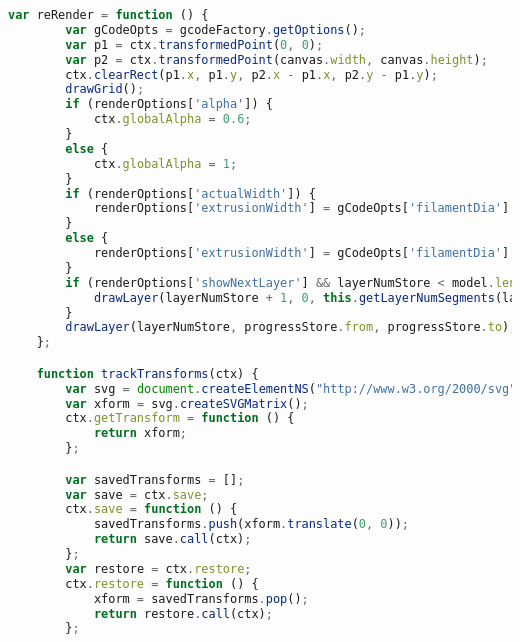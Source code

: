 \begin{lstlisting}[language=JavaScript, label={lst:renderFactory}, caption=When render frames are requested this file compiles the lines of gcode from the worker and sets up the rest of the canvas frames.]
    var reRender = function () {
        var gCodeOpts = gcodeFactory.getOptions();
        var p1 = ctx.transformedPoint(0, 0);
        var p2 = ctx.transformedPoint(canvas.width, canvas.height);
        ctx.clearRect(p1.x, p1.y, p2.x - p1.x, p2.y - p1.y);
        drawGrid();
        if (renderOptions['alpha']) {
            ctx.globalAlpha = 0.6;
        }
        else {
            ctx.globalAlpha = 1;
        }
        if (renderOptions['actualWidth']) {
            renderOptions['extrusionWidth'] = gCodeOpts['filamentDia'] * gCodeOpts['wh'] / zoomFactor;
        }
        else {
            renderOptions['extrusionWidth'] = gCodeOpts['filamentDia'] * gCodeOpts['wh'] / zoomFactor / 2;
        }
        if (renderOptions['showNextLayer'] && layerNumStore < model.length - 1) {
            drawLayer(layerNumStore + 1, 0, this.getLayerNumSegments(layerNumStore + 1), true);
        }
        drawLayer(layerNumStore, progressStore.from, progressStore.to);
    };

    function trackTransforms(ctx) {
        var svg = document.createElementNS("http://www.w3.org/2000/svg", 'svg');
        var xform = svg.createSVGMatrix();
        ctx.getTransform = function () {
            return xform;
        };

        var savedTransforms = [];
        var save = ctx.save;
        ctx.save = function () {
            savedTransforms.push(xform.translate(0, 0));
            return save.call(ctx);
        };
        var restore = ctx.restore;
        ctx.restore = function () {
            xform = savedTransforms.pop();
            return restore.call(ctx);
        };


\end{lstlisting}
